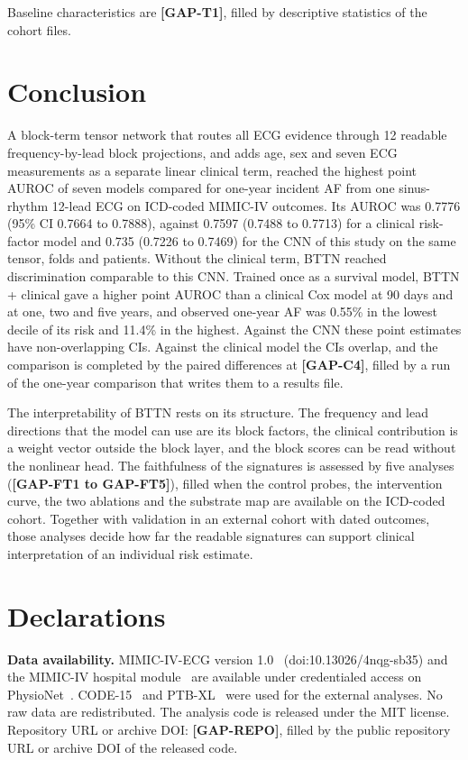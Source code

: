 \documentclass[preprint,12pt]{elsarticle}
\begin{document}
Baseline characteristics are \textbf{[GAP-T1]}, filled by descriptive statistics of the cohort files.

\section{Conclusion}

A block-term tensor network that routes all ECG evidence through 12 readable frequency-by-lead block projections, and adds age, sex and seven ECG measurements as a separate linear clinical term, reached the highest point AUROC of seven models compared for one-year incident AF from one sinus-rhythm 12-lead ECG on ICD-coded MIMIC-IV outcomes. Its AUROC was 0.7776 (95\% CI 0.7664 to 0.7888), against 0.7597 (0.7488 to 0.7713) for a clinical risk-factor model and 0.735 (0.7226 to 0.7469) for the CNN of this study on the same tensor, folds and patients. Without the clinical term, BTTN reached discrimination comparable to this CNN. Trained once as a survival model, BTTN + clinical gave a higher point AUROC than a clinical Cox model at 90 days and at one, two and five years, and observed one-year AF was 0.55\% in the lowest decile of its risk and 11.4\% in the highest. Against the CNN these point estimates have non-overlapping CIs. Against the clinical model the CIs overlap, and the comparison is completed by the paired differences at \textbf{[GAP-C4]}, filled by a run of the one-year comparison that writes them to a results file.

The interpretability of BTTN rests on its structure. The frequency and lead directions that the model can use are its block factors, the clinical contribution is a weight vector outside the block layer, and the block scores can be read without the nonlinear head. The faithfulness of the signatures is assessed by five analyses (\textbf{[GAP-FT1 to GAP-FT5]}), filled when the control probes, the intervention curve, the two ablations and the substrate map are available on the ICD-coded cohort. Together with validation in an external cohort with dated outcomes, those analyses decide how far the readable signatures can support clinical interpretation of an individual risk estimate.

\section*{Declarations}

\textbf{Data availability.} MIMIC-IV-ECG version 1.0~\cite{gow2023} (doi:10.13026/4nqg-sb35) and the MIMIC-IV hospital module~\cite{johnson2023} are available under credentialed access on PhysioNet~\cite{goldberger2000}. CODE-15~\cite{ribeiro2021code15} and PTB-XL~\cite{wagner2020} were used for the external analyses. No raw data are redistributed. The analysis code is released under the MIT license. Repository URL or archive DOI: \textbf{[GAP-REPO]}, filled by the public repository URL or archive DOI of the released code.
\end{document}

